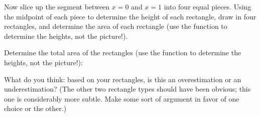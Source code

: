 \documentclass[11pt,fleqn]{article}
\begin{document}
\begin{adjustbox}{valign=t,minipage={.45\textwidth}}

\item Now slice up the segment between $x = 0$ and $x = 1$ into four equal pieces. Using the {\sc midpoint} of each piece to determine the height of each rectangle, draw in four rectangles, and determine the area of each rectangle (use the function to determine the heights, not the picture!).
\end{adjustbox}
\begin{adjustbox}{valign=t,minipage={.45\textwidth}}
\begin{center}
\end{center}
\end{adjustbox}

Determine the total area of the rectangles (use the function to determine the heights, not the picture!):

\vspace{.75in}

What do you think: based on your rectangles, is this an overestimation or an underestimation? (The other two rectangle types should have been obvious; this one is considerably more subtle. Make some sort of argument in favor of one choice or the other.)
\vspace{.75in}

\newpage

\begin{center}
\end{center}
\end{document}
